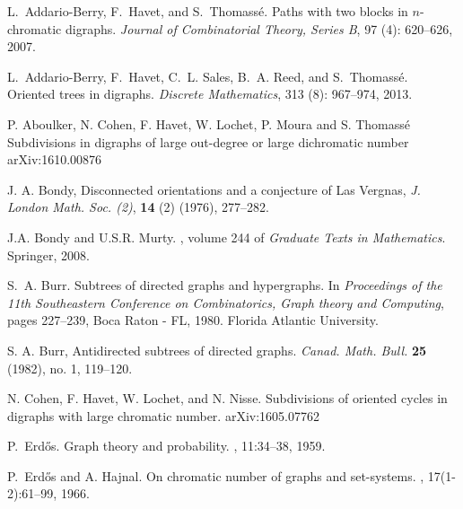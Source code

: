 \documentclass[utf8,10pt]{article}
\theoremstyle{plain}
\theoremstyle{definition}
\theoremstyle{remark}
\begin{document}
\begin{thebibliography}{XX}

L.~Addario-Berry, F.~Havet, and S.~Thomass{\'e}.
\newblock Paths with two blocks in $n$-chromatic digraphs.
\newblock \emph{Journal of Combinatorial Theory, Series B}, 97
  (4): 620--626, 2007.

L.~Addario-Berry, F.~Havet, C.~L. Sales, B.~A. Reed, and S.~Thomass{\'e}.
\newblock Oriented trees in digraphs.
\newblock \emph{Discrete Mathematics}, 313 (8): 967--974,
  2013.

P. Aboulker, N. Cohen, F. Havet, W. Lochet, P. Moura and S. Thomassé
\newblock Subdivisions in digraphs of large out-degree or large dichromatic number
\newblock arXiv:1610.00876


    J. A. Bondy, Disconnected orientations and a conjecture of Las Vergnas,
{\it J. London Math. Soc. (2)}, {\bf 14} (2) (1976), 277--282.


J.A. Bondy and U.S.R. Murty.
, volume 244 of {\em Graduate Texts in
  Mathematics}.
\newblock Springer, 2008.



S.~A. Burr.
\newblock Subtrees of directed graphs and hypergraphs.
\newblock In \emph{Proceedings of the 11th Southeastern Conference on
  Combinatorics, Graph theory and Computing}, pages 227--239, Boca Raton - FL,
  1980. Florida Atlantic University.

 S. A. Burr,
Antidirected subtrees of directed graphs.
{\it Canad. Math. Bull.} {\bf 25} (1982), no. 1, 119--120.

N. Cohen, F. Havet, W. Lochet, and N. Nisse.
\newblock Subdivisions of oriented cycles in digraphs with large chromatic number.
\newblock arXiv:1605.07762

P.~Erd{\H{o}}s.
\newblock Graph theory and probability.
, 11:34--38, 1959.

P.~Erd{\H{o}}s and A. Hajnal.
\newblock On chromatic number of graphs and set-systems.
, 17(1-2):61--99, 1966.




\end{thebibliography}
\end{document}
